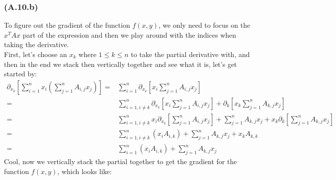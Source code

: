 \documentclass[]{article}
\begin{document}
        \subsubsection*{(A.10.b)}
            To figure out the gradient of the function $f(x,y)$, we only need to focus on the $x^TAx$ part of the expression and then we play around with the indices when taking the derivative.
            \\
            First, let's choose an $x_k$ where $1 \le k \le n$ to take the partial derivative with, and then in the end we stack then vertically together and see what it is, let's get started by: 
            \begin{align*}\tag{2.10.b.1}\label{eqn:2.10.b.1}
                \partial_{x_k} \left[
                    \sum_{i = 1}^{n}x_i\left(
                        \sum_{j = 1}^{n}A_{i, j}x_j
                    \right)
                \right]
                =& 
                \sum_{i = 1}^{n}
                \partial_{x_k} \left[
                    x_i \sum_{j = 1}^{n}A_{i, j}x_j
                \right]
                \\
                =&
                \sum_{i = 1, i \neq k}^{n}
                \partial_{x_k} \left[
                    x_i
                        \sum_{j = 1}^{n}A_{i, j}x_j
                \right]
                +\partial_k \left[
                    x_k
                    \sum_{j = 1}^{n}A_{k, j}x_j
                \right]
                \\
                =&
                \sum_{i = 1, i \neq k}^{n}
                x_i
                \partial_{x_k} \left[ 
                        \sum_{j = 1}^{n}A_{i, j}x_j
                \right]
                +
                \sum_{j = 1}^{n}A_{k, j}x_j
                + 
                x_k
                \partial_k \left[
                    \sum_{j = 1}^{n}A_{k, j}x_j
                \right]
                \\
                =&
                \sum_{i = 1, i \neq k}^{n}
                \left(
                    x_i
                    A_{i, k}
                \right)
                + 
                \sum_{j = 1}^{n}A_{k, j}x_j
                + x_k A_{k, k}
                \\
                =&
                \sum_{i = 1}^{n}\left(x_i A_{i, k}\right)
                + 
                \sum_{j = 1}^{n}A_{k, j}x_j
            \end{align*}
            Cool, now we vertically stack the partial together to get the gradient for the function $f(x, y)$, which looks like: 
\end{document}
